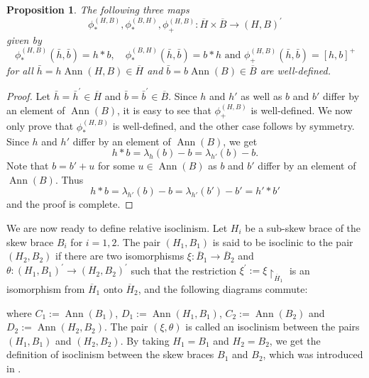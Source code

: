 \documentclass[11pt, oneside]{amsart}
\numberwithin{equation}{section}
\theoremstyle{plain}
\newtheorem{pro}[equation]{Proposition}
\theoremstyle{definition}
\newcommand{\Ann}{\operatorname{Ann} }
\begin{document}
\begin{pro}
      The following three maps 
      $${\phi_\ast^{(H,B)}},{\phi_\ast^{(B,H)}},{\phi_+^{(H,B)}}:{\overline{H}}\times {\overline{B}}\rightarrow(H,B)^\prime$$
      given by 
      $${\phi_\ast^{(H,B)}}(\bar{h},\bar{b})=h\ast b, \quad {\phi_\ast^{(B,H)}}(\bar{h},\bar{b})=b\ast h \mbox{ and } {\phi_+^{(H,B)}}(\bar{h},\bar{b})=[h,b]^+$$ 
      for all $\bar{h}=h \Ann{(H,B)}\in {\overline{H}}$ and  $\bar{b}=b \Ann{(B)}\in {\overline{B}}$  are well-defined. 
\end{pro}
\begin{proof}
      Let $\bar{h} = \bar{h}^\prime \in {\overline{H}}$ and $\bar{b} = \bar{b}^\prime \in {\overline{B}}$. Since $h$ and $h'$ as well as $b$ and $b'$ differ by an element of $\Ann(B)$, it is easy to see that
     ${\phi_+^{(H,B)}}$ is well-defined. We now only prove that 
  ${\phi_\ast^{(H,B)}}$ is well-defined, and the other case follows by symmetry. Since $h$ and $h'$ differ by an element of $\Ann(B)$, we get 
$$
h*b = \lambda_h(b) - b = \lambda_{h'}(b) - b.
$$
Note that $b = b' +u$ for some $u \in \Ann(B)$ as $b$ and $b'$ differ by an element of $\Ann(B)$. Thus 
$$h*b = \lambda_{h'}(b) - b = \lambda_{h'}(b') - b' = h' * b'$$
and the proof is complete.
\end{proof}

We are now ready to define relative isoclinism.
      Let $H_i$ be a sub-skew brace of the skew brace $B_i$ for $i = 1, 2$. 
      The pair $(H_1,B_1)$ is said to be isoclinic to the pair $(H_2,B_2)$
 if there are two isomorphisms $\xi:\overline{B}_1\rightarrow \overline{B}_2$ and $\theta:(H_1,B_1)^\prime\rightarrow (H_2,B_2)^\prime$ such that the restriction $\xi^\prime:=\xi{\restriction}_{\overline{H}_1}$ is an isomorphism from $\overline{H}_1$ onto $\overline{H}_2$, and the following diagrams commute:
\begin{center} %
\end{center}
where $C_1:=\Ann{(B_1)}$, $D_1 := \Ann{(H_1,B_1)}$, $C_2:=\Ann{(B_2)}$ and $D_2:= \Ann{(H_2,B_2)}$. The pair $(\xi,\theta)$ is called an isoclinism between the pairs $(H_1,B_1)$ and $(H_2,B_2)$. By taking $H_1 = B_1$ and $H_2 = B_2$, we get the definition of isoclinism between the skew braces $B_1$ and $B_2$, which was introduced in \cite{LV24}.
\end{document}
